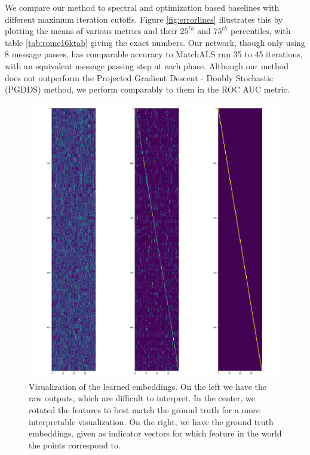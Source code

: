 \documentclass[10pt,twocolumn,letterpaper]{article}
\begin{document}
We compare our method to spectral and optimization based baselines with different maximum iteration cutoffs.
Figure \ref{fig:errorlines} illustrates this by plotting the means of various metrics and their $25^{th}$ and $75^{th}$ percentiles, with table \ref{tab:rome16ktab} giving the exact numbers.
Our network, though only using 8 message passes, has comparable accuracy to MatchALS \cite{zhou2015multi} run 35 to 45 iterations, with an equivalent message passing step at each phase.
Although our method does not outperform the Projected Gradient Descent - Doubly Stochastic (PGDDS) \cite{leonardos2016distributed} method, we perform comparably to them in the ROC AUC metric.

\begin{figure}[t]
\begin{center}
  \includegraphics[width=0.7\linewidth]{figures-EmbeddingsViz.png}
  \end{center}
     \caption{
         Visualization of the learned embeddings.
         On the left we have the raw outputs, which are difficult to interpret.
         In the center, we rotated the features to best match the ground truth for a more interpretable visualization.
         On the right, we have the ground truth embeddings, given as indicator vectors for which feature in the world the points correspond to.
     }
  \label{fig:onecol}
  \label{fig:embeddingsviz}
\end{figure}
\end{document}
